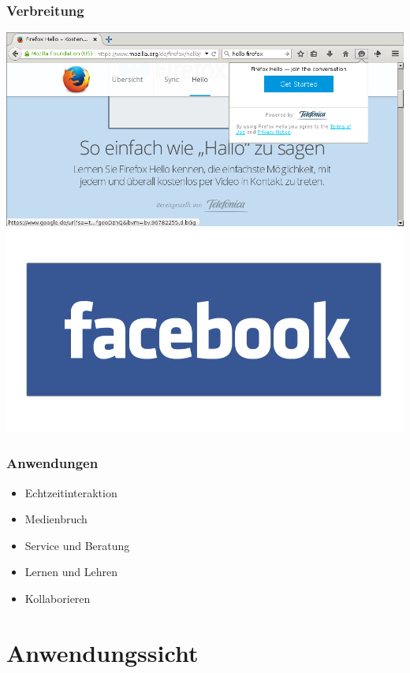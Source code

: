 \documentclass[12pt]{beamer}
\begin{document}
\begin{frame}
  \frametitle{Verbreitung}
  \begin{center}
    \pause
    \includegraphics[height=0.4\textheight]{img/hello_firefox.png} \\
    \pause
    \includegraphics[height=0.3\textheight]{img/facebook.jpg}
  \end{center}
\end{frame}

\begin{frame}
  \frametitle{Anwendungen}
  \begin{itemize}
    \item<2-> Echtzeitinteraktion
    \item<3-> Medienbruch
    \item<4-> Service und Beratung
    \item<5-> Lernen und Lehren
    \item<6-> Kollaborieren
  \end{itemize}
\end{frame}


\section{Anwendungssicht}
\end{document}
